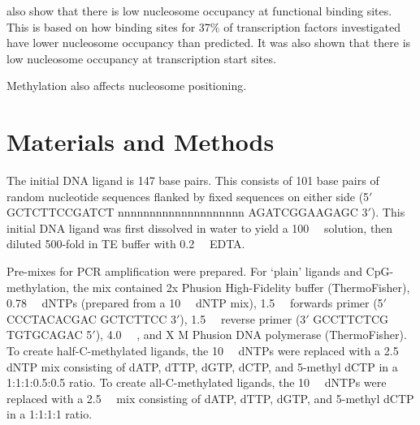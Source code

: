 \documentclass[parskip=full, numbers=noenddot]{scrreprt}
\begin{document}
\cite{segal_genomic_2006} also show that there is low nucleosome occupancy at functional binding sites.  This is based on how binding sites for 37\% of transcription factors investigated have lower nucleosome occupancy than predicted.  It was also shown that there is low nucleosome occupancy at transcription start sites.

Methylation also affects nucleosome positioning.



\subsection{}
\label{ssec:emsaselex_intro_why}


\section{Materials and Methods}
\label{sec:emsaselex_methods}

The initial DNA ligand is 147 base pairs. This consists of 101 base pairs of random nucleotide sequences flanked by fixed sequences on either side (5$'$ GCTCTTCCGATCT nnnnnnnnnnnnnnnnnnnn AGATCGGAAGAGC 3$'$). This initial DNA ligand was first dissolved in water to yield a \SI{100}{\micro\Molar} solution, then diluted 500-fold in TE buffer with \SI{0.2}{\milli\Molar} EDTA.

Pre-mixes for PCR amplification were prepared. For `plain' ligands and CpG-methylation, the mix contained 2x Phusion High-Fidelity buffer (ThermoFisher), \SI{0.78}{\milli\Molar} dNTPs (prepared from a \SI{10}{\milli\Molar} dNTP mix), \SI{1.5}{\micro\Molar} forwards primer (5$'$ CCCTACACGAC GCTCTTCC 3$'$), \SI{1.5}{\micro\Molar} reverse primer (3$'$ GCCTTCTCG TGTGCAGAC 5$'$), \SI{4.0}{\micro\Molar} , and X M Phusion DNA polymerase (ThermoFisher). To create half-C-methylated ligands, the \SI{10}{\milli\Molar} dNTPs were replaced with a \SI{2.5}{\milli\Molar} dNTP mix consisting of dATP, dTTP, dGTP, dCTP, and 5-methyl dCTP in a 1:1:1:0.5:0.5 ratio. To create all-C-methylated ligands, the \SI{10}{\milli\Molar} dNTPs were replaced with a \SI{2.5}{\milli\Molar} mix consisting of dATP, dTTP, dGTP, and 5-methyl dCTP in a 1:1:1:1 ratio.
\end{document}
